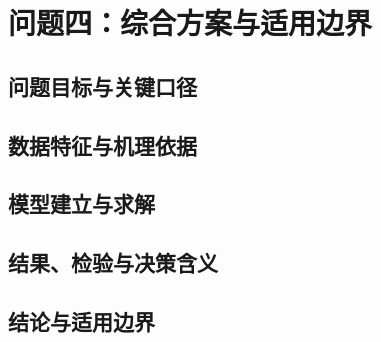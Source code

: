 \SectionStart
\section{问题四：综合方案与适用边界}
\subsection{问题目标与关键口径}
\subsection{数据特征与机理依据}
\subsection{模型建立与求解}
\subsection{结果、检验与决策含义}
\subsection{结论与适用边界}
